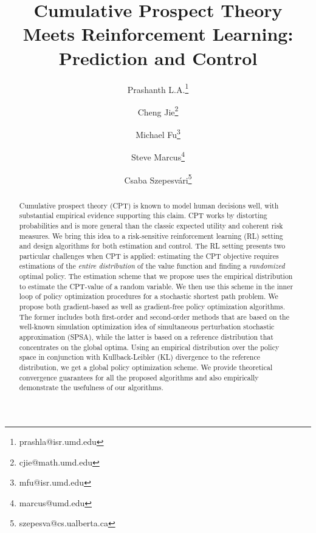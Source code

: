 \documentclass[11pt,letterpaper,english]{article}
\begin{document}
\title{Cumulative Prospect Theory Meets Reinforcement Learning: Prediction and Control}

\author[1]{Prashanth L.A.\thanks{prashla@isr.umd.edu}}
\author[2]{Cheng Jie\thanks{cjie@math.umd.edu}}
\author[3]{Michael Fu\thanks{mfu@isr.umd.edu}}
\author[4]{Steve Marcus\thanks{marcus@umd.edu}}
\author[5]{Csaba Szepesv\'ari\thanks{szepesva@cs.ualberta.ca}}

\renewcommand\Authands{ and }

\date{}

\maketitle

\begin{abstract}
Cumulative prospect theory (CPT) is known to model human decisions well, with substantial empirical evidence supporting this claim. 
CPT works by distorting probabilities and is more general than the classic expected utility and coherent risk measures. We bring this idea to a risk-sensitive reinforcement learning (RL) setting and design algorithms for both estimation and control.
The RL setting presents two particular challenges when CPT is applied: estimating the CPT objective requires estimations of the {\it entire distribution} of the value function and finding a {\it randomized} optimal policy.
The estimation scheme that we propose uses the empirical distribution to estimate the CPT-value of a random variable. We then use this scheme in the inner loop of policy optimization procedures for a stochastic shortest path problem. 
We propose both gradient-based as well as gradient-free policy optimization algorithms. The former includes both first-order and second-order methods that are based on the well-known simulation optimization idea of simultaneous perturbation stochastic approximation (SPSA), while the latter is based on a reference distribution that concentrates on the global optima. Using an empirical distribution over the policy space in conjunction with  Kullback-Leibler (KL) divergence to the reference distribution, we get a global policy 
optimization scheme.
We provide theoretical convergence guarantees for all the proposed algorithms and also empirically demonstrate the usefulness of our algorithms. 
\end{abstract}
\end{document}
